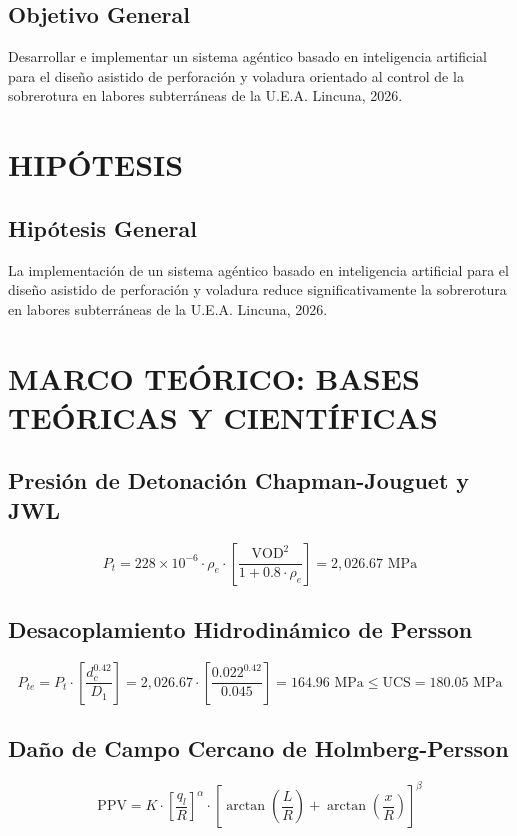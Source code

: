 \documentclass[12pt,a4paper]{article}
\begin{document}
\subsection{Objetivo General}
Desarrollar e implementar un sistema agéntico basado en inteligencia artificial para el diseño asistido de perforación y voladura orientado al control de la sobrerotura en labores subterráneas de la U.E.A. Lincuna, 2026.

\section{HIPÓTESIS}
\subsection{Hipótesis General}
La implementación de un sistema agéntico basado en inteligencia artificial para el diseño asistido de perforación y voladura reduce significativamente la sobrerotura en labores subterráneas de la U.E.A. Lincuna, 2026.

\section{MARCO TEÓRICO: BASES TEÓRICAS Y CIENTÍFICAS}
\subsection{Presión de Detonación Chapman-Jouguet y JWL}
\begin{equation}
P_t = 228 \times 10^{-6} \cdot \rho_e \cdot \left[ \frac{\text{VOD}^2}{1 + 0.8 \cdot \rho_e} \right] = 2,026.67\text{ MPa}
\end{equation}

\subsection{Desacoplamiento Hidrodinámico de Persson}
\begin{equation}
P_{te} = P_t \cdot \left[ \frac{d_c^{0.42}}{D_1} \right] = 2,026.67 \cdot \left[ \frac{0.022^{0.42}}{0.045} \right] = 164.96\text{ MPa} \le \text{UCS} = 180.05\text{ MPa}
\end{equation}

\subsection{Daño de Campo Cercano de Holmberg-Persson}
\begin{equation}
\text{PPV} = K \cdot \left[ \frac{q_l}{R} \right]^\alpha \cdot \left[ \arctan\left(\frac{L}{R}\right) + \arctan\left(\frac{x}{R}\right) \right]^\beta
\end{equation}
\end{document}
